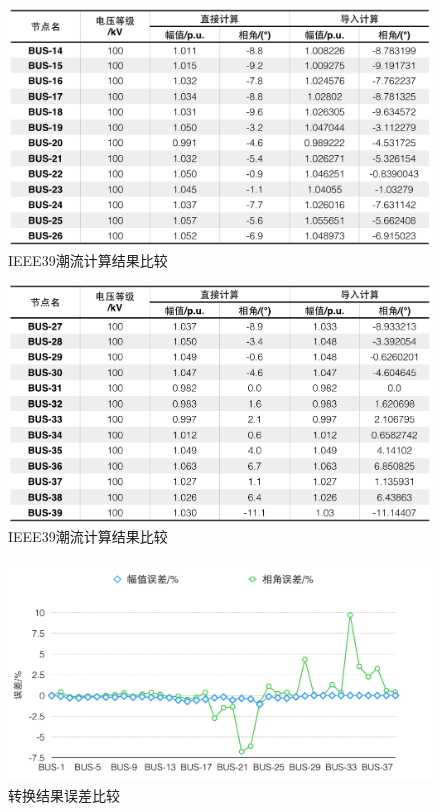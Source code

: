 \begin{figure}[H]
\centering
\includegraphics[width=1.0\textwidth]{images/Paper_Fig_57.png}
\setcaptionwidth{\linewidth}
\caption{IEEE39潮流计算结果比较}
\end{figure}

\begin{figure}[H]
\centering
\includegraphics[width=1.0\textwidth]{images/Paper_Fig_58.png}
\setcaptionwidth{\linewidth}
\caption{IEEE39潮流计算结果比较}
\end{figure}

\begin{figure}[H]
\centering
\includegraphics[width=1.0\textwidth]{images/Paper_Fig_59.png}
\setcaptionwidth{\linewidth}
\caption{转换结果误差比较}
\end{figure}

